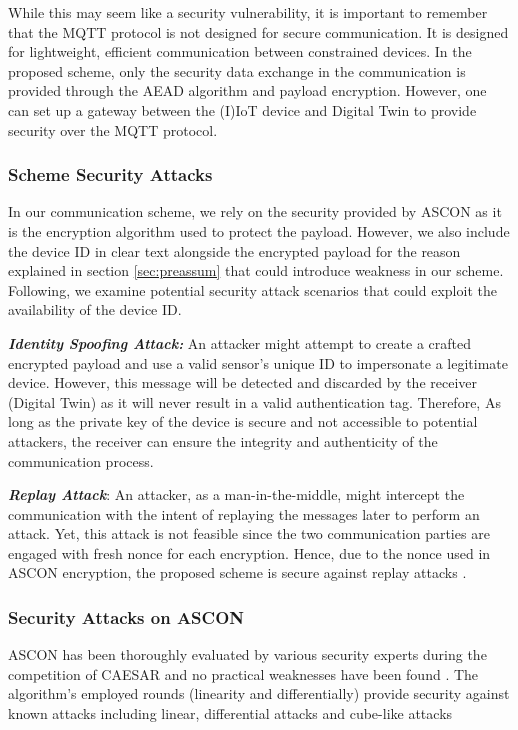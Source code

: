 While this may seem like a security vulnerability, it is important to remember that the MQTT protocol is not designed for secure communication. It is designed for lightweight, efficient communication between constrained devices. In the proposed scheme, only the security data exchange in the communication is provided through the AEAD algorithm and payload encryption. However, one can set up a gateway between the (I)IoT device and Digital Twin to provide security over the MQTT protocol. 

\subsubsection*{Scheme Security Attacks }
In our communication scheme, we rely on the security provided by ASCON as it is the encryption algorithm used to protect the payload. However, we also include the device ID in clear text alongside the encrypted payload for the reason explained in section \ref{sec:preassum} that could introduce weakness in our scheme. Following, we examine potential security attack scenarios that could exploit the availability of the device ID. 

\textbf{\textit{Identity Spoofing Attack:}} An attacker might attempt to create a crafted encrypted payload and use a valid sensor's unique ID to impersonate a legitimate device. However, this message will be detected and discarded by the receiver (Digital Twin) as it will never result in a valid authentication tag. Therefore, As long as the private key of the device is secure and not accessible to potential attackers, the receiver can ensure the integrity and authenticity of the communication process.

\textbf{\textit{Replay Attack}}: 
An attacker, as a man-in-the-middle, might intercept the communication with the intent of replaying the messages later to perform an attack. Yet, this attack is not feasible since the two communication parties are engaged with fresh nonce for each encryption. Hence, due to the nonce used in ASCON encryption, the proposed scheme is secure against replay attacks \cite{dobraunig_ascon_nodate}.  

\subsubsection{Security Attacks on ASCON}
ASCON has been thoroughly evaluated by various security experts during the competition of CAESAR and no practical weaknesses have been found \cite{dobraunig_ascon_nodate}. The algorithm's employed rounds (linearity and differentially) provide security against known attacks including linear, differential attacks and cube-like attacks \cite{dobraunig_cryptanalysis_2015}

